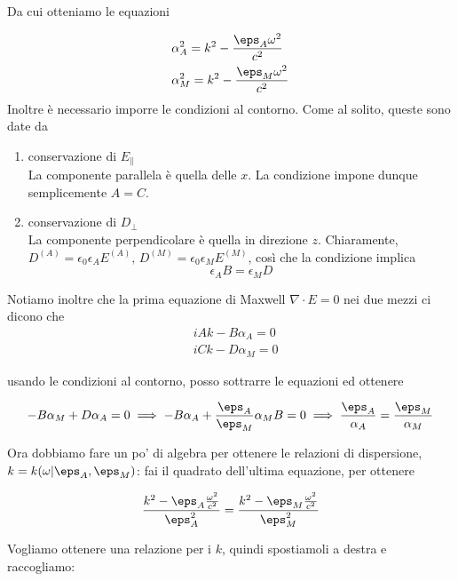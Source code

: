 \documentclass{report}
\begin{document}
Da cui otteniamo le equazioni

\begin{align}
    &\alpha_A^2 = k^2 - \frac{\eps_A\omega^2}{c^2} \\
    &\alpha_M^2 = k^2 - \frac{\eps_M\omega^2}{c^2}
\end{align}
Inoltre è necessario imporre le condizioni al contorno. Come al solito, queste sono date da 

\begin{enumerate}
    \item conservazione di $E_{\parallel}$ \\
    La componente parallela è quella delle $x$. La condizione impone dunque semplicemente $A = C$. 
    \item conservazione di $D_{\perp}$\\
    La componente perpendicolare è quella in direzione $z$. Chiaramente, $D^{(A)} = \epsilon_0\epsilon_A E^{(A)}, \, D^{(M)} = \epsilon_0\epsilon_ME^{(M)}$, così che la condizione implica 
    \begin{equation}
        \epsilon_A B = \epsilon_M D
    \end{equation} 
\end{enumerate}


Notiamo inoltre che la prima equazione di Maxwell $\nabla \cdot E = 0$ nei due mezzi ci dicono che 
\begin{align}
    &iAk -B\alpha_A = 0 \\
    & iCk -D\alpha_M = 0 
\end{align}

usando le condizioni al contorno, posso sottrarre le equazioni ed ottenere

\begin{align}
    -B\alpha_M + D\alpha_A = 0 \implies -B\alpha_A + \frac{\eps_A}{\eps_M}\alpha_M B = 0 \implies \frac{\eps_A}{\alpha_A} = \frac{\eps_M}{\alpha_M}
\end{align}


Ora dobbiamo fare un po' di algebra per ottenere le relazioni di dispersione, \(k = k(\omega | \eps_A, \eps_M)\): fai il quadrato dell'ultima equazione, per ottenere

\begin{align}
    \frac{k^2 - \eps_A\frac{\omega^2}{c^2}}{\eps_A^2} = \frac{k^2 - \eps_M\frac{\omega^2}{c^2}}{\eps_M^2} 
\end{align}

Vogliamo ottenere una relazione per i \(k\), quindi spostiamoli a destra e raccogliamo: 
\end{document}
